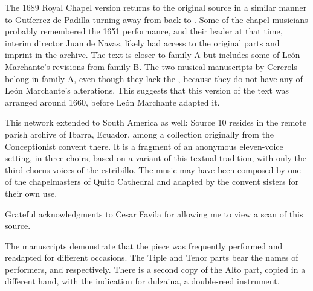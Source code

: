 The 1689 Royal Chapel version returns to the original source in a similar manner
to Gutíerrez de Padilla turning away from  back to
.
Some of the chapel musicians probably remembered the 1651 performance, and
their leader at that time, interim director Juan de Navas, likely had access to
the original parts and imprint in the archive.%
    \Autocite[]{DMEH} %
The text is closer to family A but includes some of León Marchante's
revisions from family B.
The two musical manuscripts by Cererols belong in family A, even though they
lack the , because they do not have any of León Marchante's
alterations.
This suggests that this version of the text was arranged around 1660, before
León Marchante adapted it.

This network extended to South America as well: Source 10 resides in the remote
parish archive of Ibarra, Ecuador, among a collection originally from the
Conceptionist convent there.
It is a fragment of an anonymous eleven-voice setting, in three choirs, based on
a variant of this textual tradition, with only the third-chorus voices of the
estribillo.
The music may have been composed by one of the chapelmasters of Quito Cathedral
and adapted by the convent sisters for their own use.%
\begin{Footnote}
    Grateful acknowledgments to Cesar Favila for allowing me to view a scan of
    this source.
\end{Footnote}
The manuscripts demonstrate that the piece was frequently performed and
readapted for different occasions.
The Tiple and Tenor parts bear the names of performers, 
and  respectively.
There is a second copy of the Alto part, copied in a different hand, with the
indication for dulzaina, a double-reed instrument.

